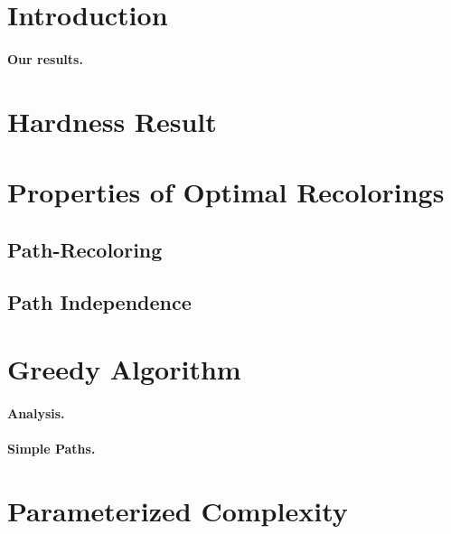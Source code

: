 

\section{Introduction}

	
\paragraph*{\bf Our results.}


\section{Hardness Result}



\section{Properties of Optimal Recolorings}

	
	\subsection{Path-Recoloring}
	
	
	\subsection{Path Independence}
	


\section{Greedy Algorithm}




\paragraph*{\bf Analysis.}


\paragraph*{\bf Simple Paths.}


\section{Parameterized Complexity}

